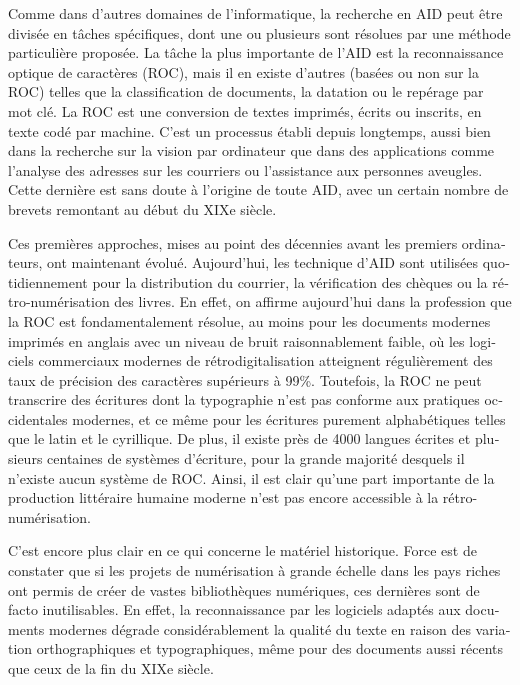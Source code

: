 \begin{french}
Comme dans d'autres domaines de l'informatique, la recherche en AID peut être
divisée en tâches spécifiques, dont une ou plusieurs sont résolues par
une méthode particulière proposée. La tâche la plus importante de l'AID est la reconnaissance optique de caractères (ROC), mais il en existe d'autres (basées ou non sur la ROC) telles que la classification de documents, la datation ou le
repérage par mot clé. La ROC est une conversion de textes imprimés,
écrits ou inscrits, en texte codé par machine. C'est un processus établi depuis
longtemps, aussi bien dans la recherche sur la vision
par ordinateur que dans des applications comme
l'analyse des adresses sur les courriers ou l'assistance aux personnes aveugles. Cette dernière est sans doute à
l'origine de toute AID, avec un certain nombre de brevets remontant
au début du XIXe siècle.

Ces premières approches, mises au point des décennies avant les premiers ordinateurs, ont
maintenant évolué. Aujourd'hui, les technique d'AID sont utilisées quotidiennement pour la distribution
du courrier, la vérification des chèques ou la rétro-numérisation des
livres. En effet, on affirme aujourd'hui dans la profession que la
ROC est fondamentalement résolue, au moins pour les documents modernes imprimés 
en anglais avec un niveau de bruit raisonnablement faible, où
les logiciels commerciaux modernes de rétrodigitalisation atteignent
régulièrement des taux de précision des caractères supérieurs à 99\%.
Toutefois, la ROC ne peut transcrire des écritures dont la typographie n'est pas conforme aux pratiques occidentales modernes, et ce même pour les écritures purement alphabétiques telles que le latin et le cyrillique. 
De plus, il existe près de 4000 langues écrites et plusieurs centaines de
systèmes d'écriture, pour la grande majorité desquels il n'existe aucun système de ROC. 
Ainsi, il est clair qu'une part importante de la
production littéraire humaine moderne n'est pas encore accessible à la
rétro-numérisation.

C'est encore plus clair en ce qui concerne le matériel historique. Force est de constater que si les projets de
numérisation à grande échelle dans les pays riches ont permis de créer de
vastes bibliothèques numériques, ces dernières sont de facto
inutilisables. En effet, la reconnaissance par les logiciels adaptés aux documents modernes dégrade considérablement la qualité du texte en raison des variation orthographiques et typographiques, même pour des documents aussi
récents que ceux de la fin du XIXe siècle.
 

\end{french}

